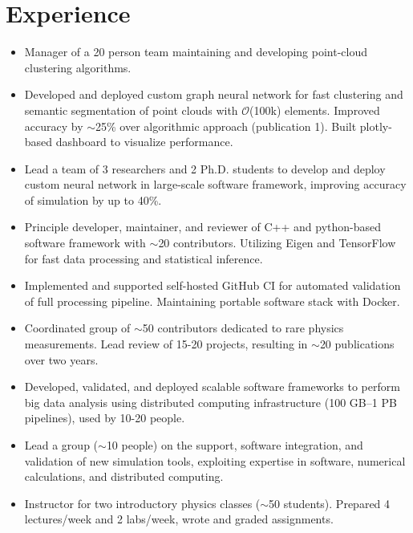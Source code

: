 \documentclass[9pt,a4paper]{moderncv}
\begin{document}
\section{Experience}
{
\begin{itemize}
    \item Manager of a 20 person team maintaining and developing point-cloud clustering algorithms.
    \item Developed and deployed custom graph neural network for fast clustering and semantic segmentation of point clouds with $\mathcal{O}$(100k) elements.
        Improved accuracy by $\sim$25\% over algorithmic approach (publication 1). Built plotly-based dashboard to visualize performance.
    \item Lead a team of 3 researchers and 2 Ph.D. students to develop and deploy custom neural network in large-scale software framework, improving accuracy of simulation by up to 40\%.
    \item Principle developer, maintainer, and reviewer of C++ and python-based software framework with $\sim$20 contributors. Utilizing Eigen and TensorFlow for fast data processing and statistical inference.
    \item Implemented and supported self-hosted GitHub CI for automated validation of full processing pipeline. Maintaining portable software stack with Docker.
    \item Coordinated group of $\sim$50 contributors dedicated to rare physics measurements. Lead review of 15-20 projects, resulting in $\sim$20 publications over two years.
\end{itemize}
}

{
\begin{itemize}
    \item Developed, validated, and deployed scalable software frameworks to perform big data analysis using
distributed computing infrastructure (100 GB--1 PB pipelines), used by 10-20 people.
    \item Lead a group ($\sim$10 people) on the support, software integration, and validation of new simulation tools, exploiting expertise in software, numerical calculations, and distributed computing.
    \item Instructor for two introductory physics classes ($\sim$50 students). Prepared 4 lectures/week and 2 labs/week, wrote and graded assignments.
\end{itemize}
}
\end{document}
